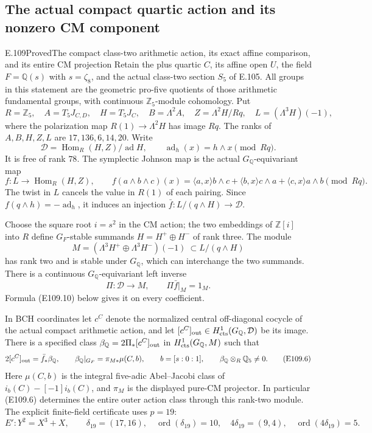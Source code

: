 \subsection*{The actual compact quartic action and its nonzero CM component}
\begin{statement}{E.109}{Proved}{The compact class-two arithmetic action, its exact affine comparison, and its entire CM projection}
Retain the plus quartic $C$, its affine open $U$, the field
$F=\mathbb Q(s)$ with $s=\zeta _8$, and the actual class-two
section $S_5$ of E.105.  All groups in this statement are the
geometric pro-five quotients of those arithmetic fundamental groups,
with continuous $\mathbb Z_5$-module cohomology.  Put
\[
 R=\mathbb Z_5,\quad A=T_5J_{C,D},\quad H=T_5J_C,
 \quad B=\Lambda^2 A,\quad Z=\Lambda^2H/Rq,
 \quad L=(\Lambda^3H)(-1),
 \tag{E109.1}
\]
where the polarization map $R(1)\to\Lambda^2H$ has image $Rq$.
The ranks of $A,B,H,Z,L$ are $17,136,6,14,20$.
Write
\[
 \mathcal D=\operatorname{Hom}_R(H,Z)/\operatorname{ad}H,
 \qquad \operatorname{ad}_h(x)=h\wedge x\pmod{Rq}.
 \tag{E109.2}
\]
It is free of rank $78$.  The symplectic Johnson map is the actual
$G_{\mathbb Q}$-equivariant map
\[
 f:L\longrightarrow\operatorname{Hom}_R(H,Z),\qquad
 f(a\wedge b\wedge c)(x)=
 \langle a,x\rangle b\wedge c+
 \langle b,x\rangle c\wedge a+
 \langle c,x\rangle a\wedge b\pmod{Rq}.
 \tag{E109.3}
\]
The twist in $L$ cancels the value in $R(1)$ of each pairing.
Since $f(q\wedge h)=-\operatorname{ad}_h$, it induces an
injection $\bar f:L/(q\wedge H)\to\mathcal D$.

Choose the square root $i=s^2$ in the CM action; the two embeddings
of $\mathbb Z[i]$ into $R$ define $G_F$-stable summands
$H=H^+\oplus H^-$ of rank three.  The module
\[
 M=(\Lambda^3H^+\oplus\Lambda^3H^-)(-1)
       \ \subset L/(q\wedge H)
 \tag{E109.4}
\]
has rank two and is stable under $G_{\mathbb Q}$, which can
interchange the two summands.  There is a continuous
$G_{\mathbb Q}$-equivariant left inverse
\[
 \Pi:\mathcal D\longrightarrow M,
 \qquad \Pi\bar f|_M=1_M.
 \tag{E109.5}
\]
Formula (E109.10) below gives it on every coefficient.

In BCH coordinates let $c^C$ denote the normalized central
off-diagonal cocycle of the actual compact arithmetic action,
and let $[c^C]_{\rm out}\in H^1_{\rm cts}(G_{\mathbb Q},\mathcal D)$
be its image.  There is a specified class
$\beta_{\mathbb Q}=2\Pi_*[c^C]_{\rm out}$ in
$H^1_{\rm cts}(G_{\mathbb Q},M)$ such that
\[
 2[c^C]_{\rm out}=\bar f_*\beta_{\mathbb Q},\qquad
 \beta_{\mathbb Q}|_{G_F}=\pi_{M*}\mu(C,b),\qquad
 b=[s:0:1],\qquad
 \beta_{\mathbb Q}\otimes_R\mathbb Q_5\ne0.
 \tag{E109.6}
\]
Here $\mu(C,b)$ is the integral five-adic Abel--Jacobi class
of $i_b(C)-[-1]i_b(C)$, and $\pi_M$ is the displayed pure-CM
projector.  In particular (E109.6) determines the entire outer
action class through this rank-two module.  The explicit
finite-field certificate uses $p=19$:
\[
 E':Y^2=X^3+X,\qquad
 \delta_{19}=(17,16),\quad \operatorname{ord}(\delta_{19})=10,
 \quad 4\delta_{19}=(9,4),\quad
 \operatorname{ord}(4\delta_{19})=5.
 \tag{E109.7}
\]


\end{statement}
